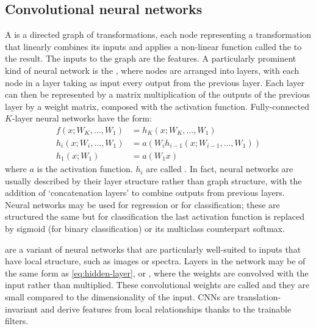     \subsection{Convolutional neural networks}
    \label{sec:cnns}

        A  is a directed graph of transformations, each node representing a transformation that linearly combines its inputs and applies a non-linear function called the  to the result. The inputs to the graph are the features. A particularly prominent kind of neural network is the , where nodes are arranged into layers, with each node in a layer taking as input every output from the previous layer. Each layer can then be represented by a matrix multiplication of the outputs of the previous layer by a weight matrix, composed with the activation function. Fully-connected $K$-layer neural networks have the form:
        \begin{align}
            f(x; W_K, \dots, W_1) &= h_K(x; W_K, \dots, W_1)\\
            h_i(x; W_i, \dots, W_1) &= a(W_i h_{i - 1}(x; W_{i - 1}, \dots, W_1))\label{eq:hidden-layer}\\
            h_1(x; W_1) &= a(W_1 x)
        \end{align}
        where $a$ is the activation function. $h_i$ are called . In fact, neural networks are usually described by their layer structure rather than graph structure, with the addition of `concatenation layers' to combine outputs from previous layers. Neural networks may be used for regression or for classification; these are structured the same but for classification the last activation function is replaced by sigmoid (for binary classification) or its multiclass counterpart softmax.

         \citep[CNN;][]{lecun98} are a variant of neural networks that are particularly well-suited to inputs that have local structure, such as images or spectra. Layers in the network may be  of the same form as \autoref{eq:hidden-layer}, or , where the weights are convolved with the input rather than multiplied. These convolutional weights are called  and they are small compared to the dimensionality of the input. CNNs are translation-invariant \citep{waibel_phoneme_1989} and derive features from local relationships thanks to the trainable filters.

